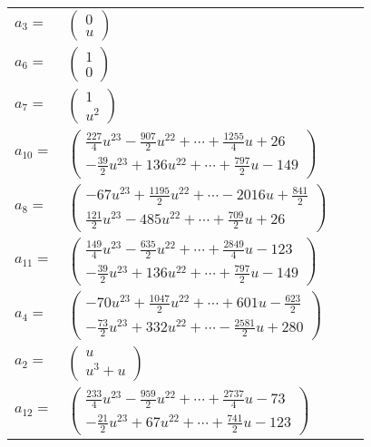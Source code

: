 \documentclass[1p]{elsarticle_modified}
\theoremstyle{definition}
\begin{document}
\begin{tabular}{m{7pt} m{180pt} m{7pt} m{180pt} }
\flushright $a_{3}=$&$\begin{pmatrix}0\\u\end{pmatrix}$ \\
\flushright $a_{6}=$&$\begin{pmatrix}1\\0\end{pmatrix}$ \\
\flushright $a_{7}=$&$\begin{pmatrix}1\\u^2\end{pmatrix}$ \\
\flushright $a_{10}=$&$\begin{pmatrix}\frac{227}{4} u^{23}-\frac{907}{2} u^{22}+\cdots+\frac{1255}{4} u+26\\-\frac{39}{2} u^{23}+136 u^{22}+\cdots+\frac{797}{2} u-149\end{pmatrix}$ \\
\flushright $a_{8}=$&$\begin{pmatrix}-67 u^{23}+\frac{1195}{2} u^{22}+\cdots-2016 u+\frac{841}{2}\\\frac{121}{2} u^{23}-485 u^{22}+\cdots+\frac{709}{2} u+26\end{pmatrix}$ \\
\flushright $a_{11}=$&$\begin{pmatrix}\frac{149}{4} u^{23}-\frac{635}{2} u^{22}+\cdots+\frac{2849}{4} u-123\\-\frac{39}{2} u^{23}+136 u^{22}+\cdots+\frac{797}{2} u-149\end{pmatrix}$ \\
\flushright $a_{4}=$&$\begin{pmatrix}-70 u^{23}+\frac{1047}{2} u^{22}+\cdots+601 u-\frac{623}{2}\\-\frac{73}{2} u^{23}+332 u^{22}+\cdots-\frac{2581}{2} u+280\end{pmatrix}$ \\
\flushright $a_{2}=$&$\begin{pmatrix}u\\u^3+u\end{pmatrix}$ \\
\flushright $a_{12}=$&$\begin{pmatrix}\frac{233}{4} u^{23}-\frac{959}{2} u^{22}+\cdots+\frac{2737}{4} u-73\\-\frac{21}{2} u^{23}+67 u^{22}+\cdots+\frac{741}{2} u-123\end{pmatrix}$ \\

\end{tabular}
\end{document}
